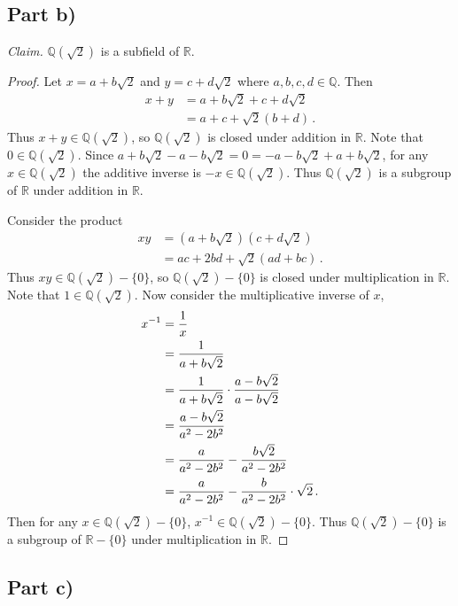 \documentclass{abrice}
\newcommand{\R}{\mathbb{R}}
\newcommand{\Q}{\mathbb{Q}}
\begin{document}
\subsection{Part b)}

\emph{Claim.} $\Q(\sqrt 2)$ is a subfield of $\R$.

\begin{proof}
  Let $x = a + b \sqrt 2$ and $y = c + d \sqrt 2$ where $a,b,c,d \in \Q$. Then
  \begin{align*}
    x + y
    &= a + b \sqrt 2 + c + d \sqrt 2 \\
    &= a + c + \sqrt 2 (b + d)\, .
  \end{align*}
  Thus $x + y \in \Q(\sqrt 2)$, so $\Q(\sqrt 2)$ is closed under addition in
  $\R$. Note that $0 \in \Q(\sqrt 2)$. Since $a + b \sqrt 2 - a -b \sqrt 2 = 0 =
  -a - b \sqrt 2 + a + b \sqrt 2$, for any $x \in \Q(\sqrt 2)$ the additive
  inverse is $-x \in \Q(\sqrt 2)$. Thus $\Q(\sqrt 2)$ is a subgroup of $\R$
  under addition in $\R$.

  Consider the product
  \begin{align*}
    xy
    &= (a + b \sqrt 2)(c + d \sqrt 2) \\
    &= ac + 2bd + \sqrt 2 (ad + bc)\, .
  \end{align*}
  Thus $xy \in \Q(\sqrt 2) - \{0\}$, so $\Q(\sqrt 2) - \{0\}$ is closed under
  multiplication in $\R$. Note that $1 \in \Q(\sqrt 2)$. Now consider the
  multiplicative inverse of $x$,
  \begin{align*}
    x^{-1}
    &= {1 \over x} \\
    &= {1 \over a + b \sqrt 2} \\
    &= {1 \over a + b \sqrt 2} \cdot {a - b \sqrt 2 \over a - b \sqrt 2} \\
    &= {a - b \sqrt 2 \over a^2 - 2b^2} \\
    &= {a \over a^2 - 2b^2} - {b \sqrt 2 \over a^2 - 2b^2} \\
    &= {a \over a^2 - 2b^2} - {b \over a^2 - 2b^2} \cdot \sqrt 2\, .
  \end{align*}
  Then for any $x \in \Q(\sqrt 2) - \{0\}$, $x^{-1} \in \Q(\sqrt 2) - \{0\}$.
  Thus $\Q(\sqrt 2) - \{0\}$ is a subgroup of $\R - \{0\}$ under multiplication
  in $\R$.
\end{proof}

\subsection{Part c)}
\end{document}
